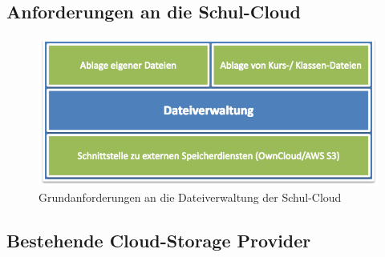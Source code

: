 \cite{survey:umfragedateiorganisationergebnisse}



\subsection{Anforderungen an die Schul-Cloud}

\begin{center}
	
	\begin{figure}[H]
		\begin{center}
			\includegraphics[width=0.8\linewidth]{images/AnforderungenDateiverwaltung}
			\caption[Caption for relatedWork]{Grundanforderungen an die Dateiverwaltung der Schul-Cloud\footnotemark}
			\label{fig:devices}
		\end{center}
	\end{figure}
\end{center}


\subsection{Bestehende Cloud-Storage Provider}


\clearpage
